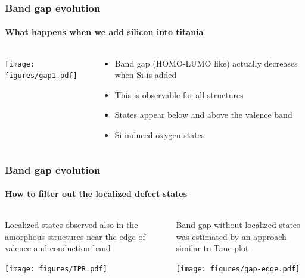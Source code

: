 \documentclass[noamsthm,8pt,t,xcolor={dvipsnames}]{beamer}
\begin{document}
\begin{frame}
   \frametitle{Band gap evolution}
   \framesubtitle{What happens when we add silicon into titania}

   \begin{columns}
      \begin{column}{0.5\textwidth}
         \begin{center}
            \texttt{[image: figures/gap1.pdf]}
         \end{center}
      \end{column}
      \begin{column}{0.5\textwidth}
         \begin{itemize}
            \item Band gap (HOMO-LUMO like) actually decreases when Si is added
            \item This is observable for all structures
            \item<2-> States appear below and above the valence band
            \item<3> Si-induced oxygen states
         \end{itemize}
         \begin{center}
         \end{center}
      \end{column}
   \end{columns}
\end{frame}

\begin{frame}
   \frametitle{Band gap evolution}
   \framesubtitle{How to filter out the localized defect states}

   \begin{columns}
      \begin{column}{0.5\textwidth}
         Localized states observed also in the amorphous structures near the edge of valence and conduction band
         \begin{center}
            \texttt{[image: figures/IPR.pdf]}
         \end{center}
      \end{column}
      \pause
      \begin{column}{0.5\textwidth}
         Band gap without localized states was estimated by an approach similar to Tauc plot
         \begin{center}
            \texttt{[image: figures/gap-edge.pdf]}
         \end{center}
      \end{column}
   \end{columns}
\end{frame}
\end{document}
